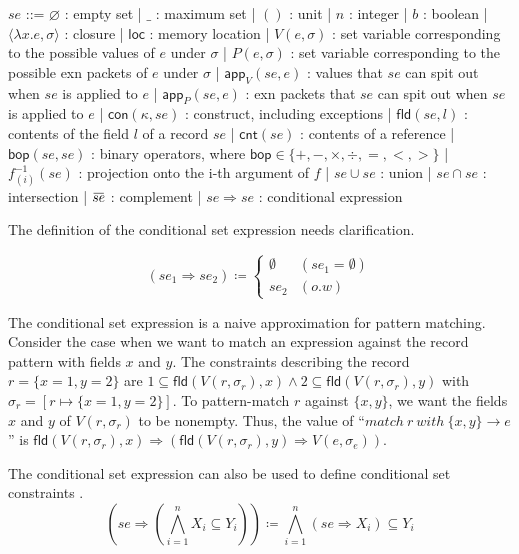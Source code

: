 \documentclass{article}
\newcommand{\loverbar}[1]{\mkern 1.5mu\overline{\mkern-1.5mu#1\mkern-1.5mu}\mkern 1.5mu}
\begin{document}
\begin{bnfgrammar}
  $se$ ::= $\varnothing$ : empty set
  | $\_$ : maximum set
  | $()$ : unit
  | $n$ : integer
  | $b$ : boolean
  | $\langle\lambda x.e,\sigma\rangle$ : closure
  | $\mathsf{loc}$ : memory location
  | $V(e,\sigma)$ : set variable corresponding to the possible values of $e$ under $\sigma$
  | $P(e,\sigma)$ : set variable corresponding to the possible exn packets of $e$ under $\sigma$
  | $\mathsf{app}_{V}(se,e)$ : values that $se$ can spit out when $se$ is applied to $e$
  | $\mathsf{app}_{P}(se,e)$ : exn packets that $se$ can spit out when $se$ is applied to $e$
  | $\mathsf{con}(\kappa,se)$ : construct, including exceptions
  | $\mathsf{fld}(se, l)$ : contents of the field $l$ of a record $se$
  | $\mathsf{cnt}(se)$ : contents of a reference
  | $\mathsf{bop}(se, se)$ : binary operators, where $\mathsf{bop}\in\{+, -, \times, \div, =, <, >\}$
  | $f^{-1}_{(i)}(se)$ : projection onto the i-th argument of $f$
  | $se \cup se$ : union
  | $se \cap se$ : intersection
  | $\loverbar{se}$ : complement
  | $se \Rightarrow se$ : conditional expression
\end{bnfgrammar}

The definition of the conditional set expression needs clarification.

\[
  (se_{1} \Rightarrow se_{2}) \coloneq
  \begin{cases}
    \emptyset & (se_{1}=\emptyset)\\
    se_{2} & (o.w)
  \end{cases}
\]

The conditional set expression is a naive approximation for pattern matching. Consider the case when we want to match an expression against the record pattern with fields $x$ and $y$.
The constraints describing the record $r = \{x = 1, y = 2\}$ are $1 \subseteq \mathsf{fld}(V(r,\sigma_{r}), x) \wedge 2 \subseteq \mathsf{fld}(V(r,\sigma_{r}), y)$ with $\sigma_{r}=[r\mapsto\{x=1, y=2\}]$.
To pattern-match $r$ against $\{x, y\}$, we want the fields $x$ and $y$ of $V(r,\sigma_{r})$ to be nonempty.
Thus, the value of ``$match\:r\:with\:\{x, y\}\rightarrow e$'' is $\mathsf{fld}(V(r,\sigma_{r}), x)\Rightarrow(\mathsf{fld}(V(r,\sigma_{r}),y)\Rightarrow V(e,\sigma_{e}))$.

The conditional set expression can also be used to define conditional set constraints \cite{Aik99}.
\[
  \left(se \Rightarrow \left(\bigwedge_{i=1}^{n}{X_{i}\subseteq Y_{i}}\right)\right) \coloneq \bigwedge_{i=1}^{n}{(se \Rightarrow X_{i}) \subseteq Y_{i}}
\]
\end{document}
